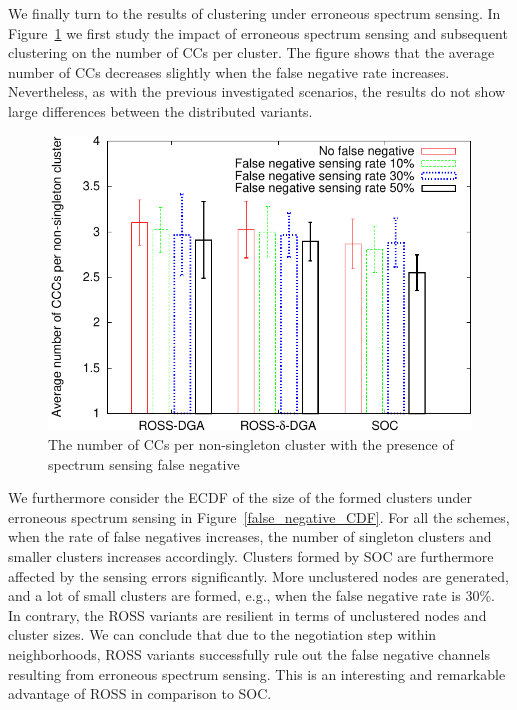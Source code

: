 \documentclass[times]{ettauth}
\newcommand{\eg}{e.g., }
\theoremstyle{mytheoremstyle}
\theoremstyle{mytheoremstyle}
\theoremstyle{mytheoremstyle}
\begin{document}
We finally turn to the results of clustering under erroneous spectrum sensing.
In Figure~\ref{false_negative_ccc} we first study the impact of erroneous spectrum sensing and subsequent clustering on the number of CCs per cluster.
The figure shows that the average number of CCs decreases slightly when the false negative rate increases.
Nevertheless, as with the previous investigated scenarios, the results do not show large differences between the distributed variants.
\begin{figure}[!h]
  \centering
   \includegraphics[width=0.7\linewidth]{false_negative.pdf}
  \caption{The number of CCs per non-singleton cluster with the presence of spectrum sensing false negative}
  \label{false_negative_ccc}
\end{figure}
We furthermore consider the ECDF of the size of the formed clusters under erroneous spectrum sensing in Figure~\ref{false_negative_CDF}.
For all the schemes, when the rate of false negatives increases, the number of singleton clusters and smaller clusters increases accordingly.
Clusters formed by SOC are furthermore affected by the sensing errors significantly.
More unclustered nodes are generated, and a lot of small clusters are formed, \eg when the false negative rate is 30\%.
In contrary, the ROSS variants are resilient in terms of unclustered nodes and cluster sizes.
We can conclude that due to the negotiation step within neighborhoods, ROSS variants successfully rule out the false negative channels resulting from erroneous spectrum sensing. 
This is an interesting and remarkable advantage of ROSS in comparison to SOC.
\end{document}
